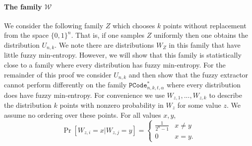 \paragraph{The family $\mathcal{W}$}
We consider the following family $Z$ which chooses $k$ points without replacement from the space $\{0,1\}^n$.  That is, if one samples $Z$ uniformly then one obtains the distribution $U_{n,k}$. We note there are distributions $W_Z$ in this family that have little fuzzy min-entropy.  However, we will show that this family is statistically close to a family where every distribution has fuzzy min-entropy.  For the remainder of this proof we consider $U_{n,k}$ and then show that the fuzzy extractor cannot perform differently on the family $\mathtt{PCode}_{n, k, t, \alpha}^{*}$ where every distribution does have fuzzy min-entropy. For convenience we use $W_{z, 1},..., W_{z,k}$ to describe the distribution $k$ points with nonzero probability in $W_z$ for some value $z$.  We assume no ordering over these points.  For all values $x, y$, 
\[
\Pr[W_{z, i} =x | W_{z, j} = y] = \begin{cases} \frac{1}{2^n-1} &x\neq y\\0&x=y.\end{cases}
\]


